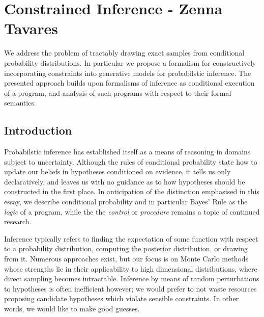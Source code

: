 
\chapter{Constrained Inference - Zenna Tavares} %

We address the problem of tractably drawing exact samples from conditional probability distributions.
In particular we propose a formalism for constructively incorporating constraints into generative models for probabilstic inference.
The presented approach builds upon formalisms of inference as conditional execution of a program, and analysis of such programs with respect to their formal semantics.

\section{Introduction}
\label{ch:examples} %


Probabilstic inference has established itself as a means of reasoning in domains subject to uncertainty.
Although the rules of conditional probability state how to update our beliefs in hypotheses conditioned on evidence, it tells us only declaratively, and leaves us with no guidance as to how hypotheses should be constructed in the first place.
In anticipation of the distinction emphasised in this essay, we describe conditional probability and in particular Bayes' Rule as the \textit{logic} of a program, while the the \textit{control} or \textit{procedure} remains a topic of continued research.

Inference typically refers to finding the expectation of some function with respect to a probability distribution, computing the posterior distribution, or drawing from it.
Numerous approaches exist, but our focus is on Monte Carlo methods whose strengths lie in their applicability to high dimensional distributions, where direct sampling becomes intractable.
Inference by means of random perturbations to hypotheses is often inefficient however; we would prefer to not waste resources proposing candidate hypotheses which violate sensible constraints.
In other words, we would like to make good guesses.

